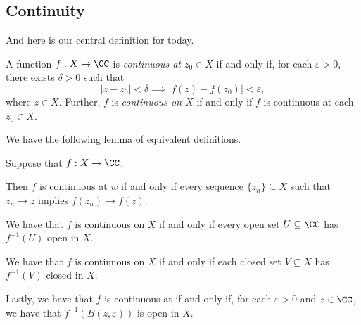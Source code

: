 \subsection{Continuity}
And here is our central definition for today.
\begin{definition}[Continuous]
	A function $f:X\to\CC$ is \textit{continuous at $z_0\in X$} if and only if, for each $\varepsilon>0$, there exists $\delta>0$ such that
	\[|z-z_0|<\delta\implies|f(z)-f(z_0)|<\varepsilon,\]
	where $z\in X$. Further, $f$ is \textit{continuous on $X$} if and only if $f$ is continuous at each $z_0\in X$.
\end{definition}
We have the following lemma of equivalent definitions.
\begin{lemma}
	Suppose that $f:X\to\CC$.
	\begin{listalph}
		\item Then $f$ is continuous at $w$ if and only if every sequence $\{z_n\}\subseteq X$ such that $z_n\to z$ implies $f(z_n)\to f(z)$.
		\item We have that $f$ is continuous on $X$ if and only if every open set $U\subseteq\CC$ has $f^{-1}(U)$ open in $X$.
		\item We have that $f$ is continuous on $X$ if and only if each closed set $V\subseteq X$ has $f^{-1}(V)$ closed in $X$.
		\item Lastly, we have that $f$ is continuous at if and only if, for each $\varepsilon>0$ and $z\in\CC$, we have that $f^{-1}(B(z,\varepsilon))$ is open in $X$.
	\end{listalph}
\end{lemma}
